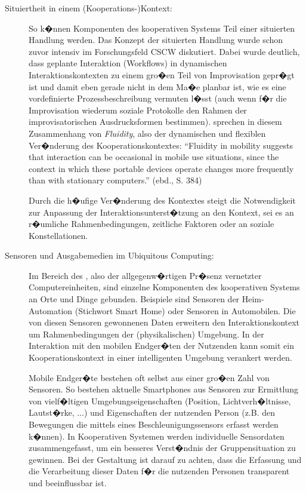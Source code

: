 \begin{description}



\item[Situiertheit in einem (Kooperations-)Kontext:] So k�nnen Komponenten des kooperativen Systems Teil einer situierten Handlung werden. Das Konzept der situierten Handlung wurde schon zuvor intensiv im Forschungsfeld CSCW diskutiert. Dabei wurde deutlich, dass geplante Interaktion (Workflows) in dynamischen Interaktionskontexten zu einem gro�en Teil von Improvisation gepr�gt ist und damit eben gerade nicht in dem Ma�e planbar ist, wie es eine vordefinierte Prozessbeschreibung vermuten l�sst (auch wenn f�r die Improvisation wiederum soziale Protokolle den Rahmen der improvisatorischen Ausdrucksformen bestimmen). \cite{Rahwan2005} sprechen in diesem Zusammenhang von \emph{Fluidity}, also der dynamischen und flexiblen Ver�nderung des Kooperationskontextes: ``Fluidity in mobility suggests that interaction can be occasional in mobile use situations, since the context in which these portable devices operate changes more frequently than with stationary computers.'' (ebd., S. 384)

Durch die h�ufige Ver�nderung des Kontextes steigt die Notwendigkeit zur Anpassung der Interaktionsunterst�tzung an den Kontext, sei es an r�umliche Rahmenbedingungen, zeitliche Faktoren oder an soziale Konstellationen. 
 

\item[Sensoren und Ausgabemedien im Ubiquitous Computing:] Im Bereich des , also der allgegenw�rtigen Pr�senz vernetzter Computereinheiten, sind einzelne Komponenten des kooperativen Systems an Orte und Dinge gebunden. Beispiele sind Sensoren der Heim-Automation (Stichwort Smart Home) oder Sensoren in Automobilen. Die von diesen Sensoren gewonnenen Daten erweitern den Interaktionskontext um Rahmenbedingungen der (physikalischen) Umgebung. In der Interaktion mit den mobilen Endger�ten der Nutzenden kann somit ein Kooperationskontext in einer intelligenten Umgebung verankert werden. 

Mobile Endger�te bestehen oft selbst aus einer gro�en Zahl von Sensoren. So bestehen aktuelle Smartphones aus Sensoren zur Ermittlung von vielf�ltigen Umgebungseigenschaften (Position, Lichtverh�ltnisse, Lautst�rke, ...) und Eigenschaften der nutzenden Person (z.B. den Bewegungen die mittels eines Beschleunigungssensors erfasst werden k�nnen). In Kooperativen Systemen werden individuelle Sensordaten zusammengefasst, um ein besseres Verst�ndnis der Gruppensituation zu gewinnen. Bei der Gestaltung ist darauf zu achten, dass die Erfassung und die Verarbeitung dieser Daten f�r die nutzenden Personen transparent und beeinflussbar ist.


\end{description}
